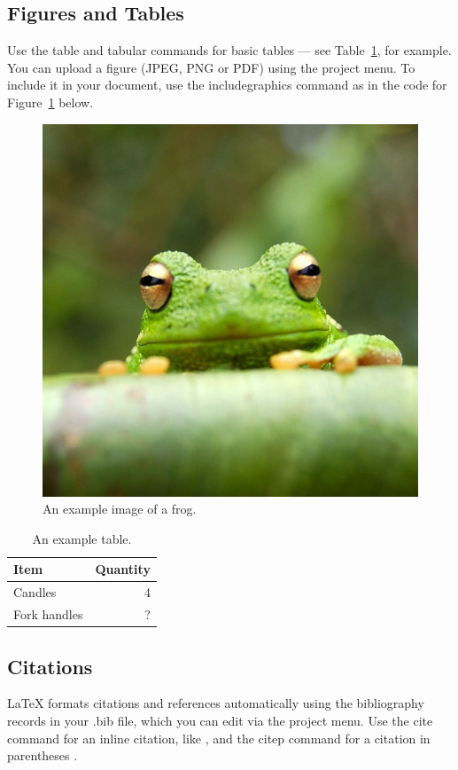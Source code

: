 \documentclass[fleqn,11pt]{olplainarticle}
\begin{document}
\subsection*{Figures and Tables}

Use the table and tabular commands for basic tables --- see Table~\ref{tab:widgets}, for example. You can upload a figure (JPEG, PNG or PDF) using the project menu. To include it in your document, use the includegraphics command as in the code for Figure~\ref{fig:view} below.

\begin{figure}[ht]
\centering
\includegraphics[width=0.7\linewidth]{frog}
\caption{An example image of a frog.}
\label{fig:view}
\end{figure}

\begin{table}[ht]
\centering
\begin{tabular}{l|r}
Item & Quantity \\\hline
Candles & 4 \\
Fork handles & ?  
\end{tabular}
\caption{\label{tab:widgets}An example table.}
\end{table}

\subsection*{Citations}

LaTeX formats citations and references automatically using the bibliography records in your .bib file, which you can edit via the project menu. Use the cite command for an inline citation, like \cite{lees2010theoretical}, and the citep command for a citation in parentheses \citep{lees2010theoretical}.
\end{document}
